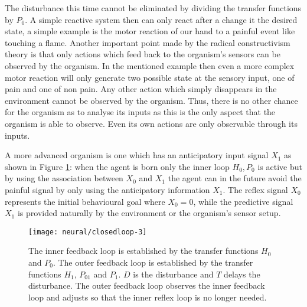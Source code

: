 The disturbance this time cannot be eliminated by dividing the transfer functions by $P_0$.
A simple reactive system then can only react after a change it the desired state, 
a simple example is the motor reaction of our hand to a painful event like touching a 
flame. 
Another important point made by the radical constructivism theory is  that only actions which 
feed back to the organism's sensors can be observed by the organism. 
In the mentioned example then even a more complex motor reaction will only generate 
two possible state at the sensory input, one of pain and one of non pain.
Any other action which simply disappears in the environment cannot be
observed by the organism. Thus, there is no other chance for the organism as to
analyse its inputs as this is the only aspect that the organism is able to observe.
Even its own actions are only observable through its inputs.

A more advanced organism is one which has an anticipatory input signal $X_1$ as
 shown in Figure \ref{Fig:Neural:ProactiveDisturbance}:
when the agent is born only the inner loop $H_0,P_0$ is active but by using the 
association between $X_0$ and $X_1$ the agent can in the future avoid the 
painful signal by only using the anticipatory information $X_1$.
The reﬂex signal $X_0$ represents the initial behavioural
goal \citep{Verschure98summary} where $X_0=0$, while the predictive signal $X_1$
is provided naturally by the environment or the organism's sensor setup.

\begin{figure}[htbp]
\begin{center}
\texttt{[image: neural/closedloop-3]}
\end{center}
\small{
\caption[Closed loop proactive system with disturbance]{
The inner feedback loop is established by the transfer functions $H_0$
and $P_0$. 
The outer feedback loop is established by the transfer functions $H_1$, $P_{01}$ 
and $P_1$. $D$ is the disturbance and $T$ delays the disturbance. 
The outer feedback loop observes the inner feedback loop and adjusts
so that the inner reﬂex loop is no longer needed.
\label{Fig:Neural:ProactiveDisturbance}}}
\end{figure}

